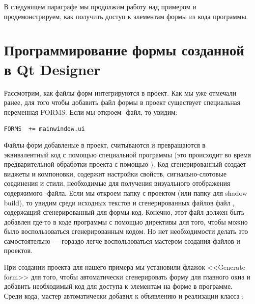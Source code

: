 В следующем параграфе мы продолжим работу над примером и продемонстрируем, как получить доступ к элементам формы из кода
программы.

\section[Программирование формы созданной в Qt Designer]{Программирование формы созданной в Qt Designer}
Рассмотрим, как файлы форм интегрируются в проект. Как мы уже отмечали ранее, для того чтобы добавить
файл формы в проект существует специальная переменная FORMS. Если мы откроем -файл, то увидим: 

\lstinline!FORMS  += mainwindow.ui!

Файлы форм добавленые в проект, считываются и превращаются в эквивалентный  код с помощью 
специальной программы 
(это происходит во время предварительной обработки проекта с помощью ). 
Код сгенерированный  создает виджеты и
компоновки, содержит настройки свойств, сигнально-слотовые соединения и стили, необходимые для получения визуального
отображения содержимого -файла. Если мы откроем папку с проектом (или папку для shadow build), то увидим среди исходных текстов и сгенерированных файлов файл , содержащий сгенерированный для формы код.
Конечно, этот файл должен быть добавлен где-то в коде программы с помощью директивы  для того, чтобы можно
было воспользоваться сгенерированным кодом. Но нет необходимости делать это самостоятельно --- гораздо легче
воспользоваться мастером создания файлов и проектов. 

При создании проекта для нашего примера мы установили флажок <<Generate form>> для того, чтобы автоматически сгенерировать
форму для главного окна и добавить необходимый код для доступа к элементам на форме в программе. Среди кода, мастер
автоматически добавил к объявлению и реализации класса : 

